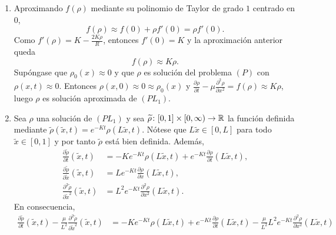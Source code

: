 \documentclass[11pt]{report}
\begin{document}
\begin{solution}
\begin{enumerate}
        En primer lugar, los tres términos de la ecuación tienen las mismas unidades, luego $[f(\rho)] = [\frac{\partial \rho}{\partial t}] = \textup{gr}/(\textup{m}^3\textup{s})$. Como $1-\frac{\rho}{R}$ es adimensional (pues $1$ lo es), entonces $[f(\rho)] = [K\rho]$. Y como $[\rho] = \textup{gr}/\textup{m}^3$, se obtiene $[K] = s^{-1}$. Del hecho de que $1-\frac{\rho}{R}$ sea adimensional también se deduce que $ [R] = [\rho] = \textup{gr}/\textup{m}^3$. Por último, como $[\mu\frac{\partial^2\rho}{\partial x^2}] = \textup{gr}/(\textup{m}^3\textup{s})$ y $[\frac{\partial^2\rho}{\partial x^2}] =  \textup{gr}/\textup{m}^5$, entonces $[\mu] = \textup{m}^{2}/\textup{s}$.
        \item Aproximando $f(\rho)$ mediante su polinomio de Taylor de grado $1$ centrado en $0$,
        \[f(\rho) \approx f(0) + \rho f'(0) = \rho f'(0).\]
        Como $f'(\rho) = K-\frac{2K\rho}{R}$, entonces $f'(0) = K$ y la aproximación anterior queda
        \[f(\rho) \approx K\rho.\]
        Supóngase que $\rho_0(x) \approx 0$ y que $\rho$ es solución del problema $(P)$ con $\rho(x,t) \approx 0$. Entonces $\rho(x,0) \approx 0 \approx \rho_0(x)$ y $\frac{\partial \rho}{\partial t}-\mu\frac{\partial^2\rho}{\partial x^2} = f(\rho) \approx K\rho$, luego $\rho$ es solución aproximada de $(PL_1)$.
        \item Sea $\rho$ una solución de $(PL_1)$ y sea $\widetilde{\rho}\colon [0,1]\times [0,\infty)\to\mathbb R$ la función definida mediante $\widetilde{\rho}(\widetilde{x},t) = e^{-Kt}\rho(L\widetilde{x},t)$. Nótese que $L\widetilde{x}\in [0,L]$ para todo $\widetilde{x} \in [0,1]$ y por tanto $\widetilde{\rho}$ está bien definida. Además,
        \begin{align*}
            \frac{\partial\widetilde{\rho}}{\partial t}(\widetilde{x},t) &= -Ke^{-Kt}\rho(L\widetilde{x},t) + e^{-Kt}\frac{\partial \rho}{\partial t}(L\widetilde{x},t), \\
            \frac{\partial\widetilde{\rho}}{\partial \widetilde{x}}(\widetilde{x},t) &= Le^{-Kt}\frac{\partial \rho}{\partial x}(L\widetilde{x},t), \\
            \frac{\partial^2\widetilde{\rho}}{\partial \widetilde{x}^2}(\widetilde{x},t) &= L^2e^{-Kt}\frac{\partial^2 \rho}{\partial x^2}(L\widetilde{x},t).
        \end{align*}
        En consecuencia,
        \begin{align*}
            \frac{\partial\widetilde{\rho}}{\partial t}(\widetilde{x},t)-\frac{\mu}{L^2}\frac{\partial^2\widetilde{\rho}}{\partial \widetilde{x}^2}(\widetilde{x},t) &= -Ke^{-Kt}\rho(L\widetilde{x},t) + e^{-Kt}\frac{\partial \rho}{\partial t}(L\widetilde{x},t)-\frac{\mu}{L^2}L^2e^{-Kt}\frac{\partial^2 \rho}{\partial x^2}(L\widetilde{x},t) \\

\end{align*}
\end{enumerate}
\end{solution}
\end{document}
